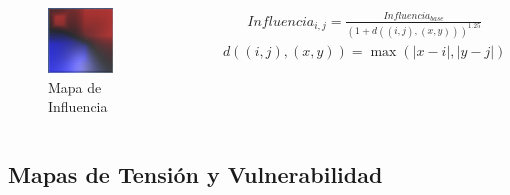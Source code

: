 \documentclass[bigger]{beamer}
\begin{document}
\begin{frame}
\frametitle{\secname} %
\framesubtitle{\subsecname} %
\rmfamily %
\color{black} %
\begin{columns}
\begin{figure}
    \centering
    \includegraphics[width=0.6\textwidth]{../doc/images/InfluenciaMap.png}
    \caption{Mapa de Influencia}
\end{figure}
\begin{gather*}
    Influencia_{i,j} = \frac{Influencia_{base}}{\left(1 + d\left((i,j), (x,y)\right)\right)^{1.25}}
\end{gather*}
\begin{gather*}
    d\left((i,j), (x,y)\right) = \max \left( \lvert x - i \rvert, \lvert y - j \rvert \right)
\end{gather*}
\end{columns}
\end{frame}

\subsection{Mapas de Tensión y Vulnerabilidad}
\end{document}
